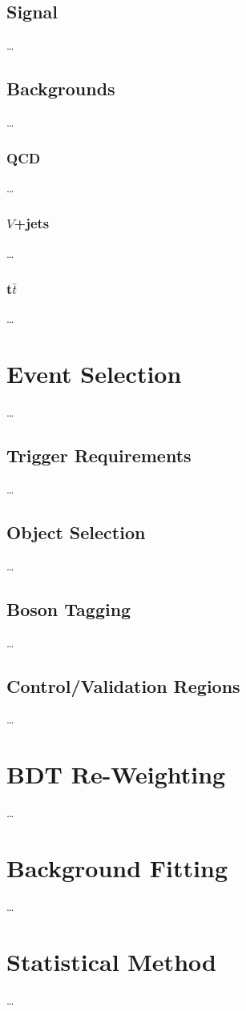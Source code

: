 \subsection{Signal}
\dots
\subsection{Backgrounds}
\dots
\subsubsection{QCD}
\dots
\subsubsection{$V$+jets}
\dots
\subsubsection{t$\bar{t}$}
\dots

\section{Event Selection}
\dots
\subsection{Trigger Requirements}
\dots
\subsection{Object Selection}
\dots
\subsection{Boson Tagging}
\dots
\subsection{Control/Validation Regions}
\dots

\section{BDT Re-Weighting}
\dots

\section{Background Fitting}
\dots

\section{Statistical Method}
\dots

